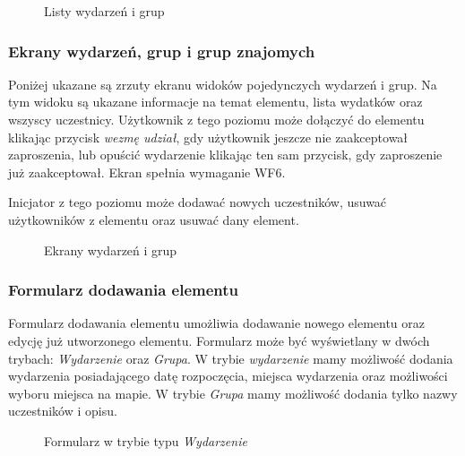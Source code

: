 \begin{figure}[h!]%
    \centering
    \qquad
    \caption{Listy wydarzeń i grup}%
\end{figure}

\clearpage
\subsubsection{Ekrany wydarzeń, grup i grup znajomych}
Poniżej ukazane są zrzuty ekranu widoków pojedynczych wydarzeń i grup. Na tym widoku są ukazane informacje na temat elementu, lista wydatków oraz wszyscy uczestnicy. Użytkownik z tego poziomu może dołączyć do elementu klikając przycisk \emph{wezmę udział}, gdy użytkownik jeszcze nie zaakceptował zaproszenia, lub opuścić wydarzenie klikając ten sam przycisk, gdy zaproszenie już zaakceptował. Ekran spełnia wymaganie WF6.

Inicjator z tego poziomu może dodawać nowych uczestników, usuwać użytkowników z elementu oraz usuwać dany element.

\begin{figure}[h!]%
    \centering
    \qquad
    \caption{Ekrany wydarzeń i grup}%
\end{figure}

\clearpage
\subsubsection{Formularz dodawania elementu}
Formularz dodawania elementu umożliwia dodawanie nowego elementu oraz edycję już utworzonego elementu. Formularz może być wyświetlany w dwóch trybach: \emph{Wydarzenie} oraz \emph{Grupa}. W trybie \emph{wydarzenie} mamy możliwość dodania wydarzenia posiadającego datę rozpoczęcia, miejsca wydarzenia oraz możliwości wyboru miejsca na mapie. W trybie \emph{Grupa} mamy możliwość dodania tylko nazwy uczestników i opisu.

\begin{figure}[h!]%
    \centering
    \qquad
    \caption{Formularz w trybie typu \emph{Wydarzenie}}%
\end{figure}

